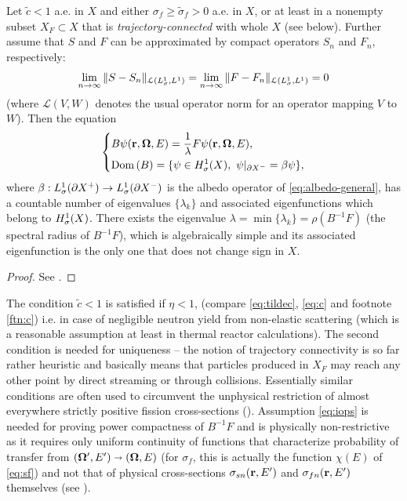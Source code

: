 \begin{theorem}\label{thm:eigenvalue}
	Let $\tilde{c} < 1$ a.e. in $X$ and either $\sigma_f \geq \tilde{\sigma}_f > 0$ a.e. in $X$, or at least in a nonempty
	subset $X_F \subset X$ that is \textit{trajectory-connected} with whole $X$ (see below). 
	Further assume that $S$ and $F$ can be approximated by compact operators $S_n$ and $F_n$, respectively:
\begin{equation}\label{eq:iops}
	\lim_{n\to\infty}\Vert S-S_n\Vert_{\mathcal{L}(\Lp[1]_{\sigma},\Lp[1])} = 
	\lim_{n\to\infty}\Vert F-F_n\Vert_{\mathcal{L}(\Lp[1]_{\sigma},\Lp[1])} = 0
\end{equation}
(where $\mathcal{L}(V,W)$ denotes the usual operator norm for an operator mapping $V$ to $W$).
Then the equation
\begin{equation*}
\left\{
  \begin{aligned}
     &B\psi(\br,\bomega,E) = \frac{1}{\lambda} F\psi(\br,\bomega,E),\\
     &\Dom{B} = \{\psi\in \Hp[1]_{\sigma}(X),\ \psi\vert_{\pX[-]} = \beta\psi\},
  \end{aligned}
\right.
\end{equation*}
where $\beta : \Lp[1]_{\sigma}(\pX[+]) \to \Lp[1]_{\sigma}(\pX[-])$ is the albedo operator of
\eqref{eq:albedo-general}, has a countable number of eigenvalues $\{\lambda_k\}$ and associated eigenfunctions which
belong to $\Hp[1]_{\sigma}(X)$.
There exists the eigenvalue $\lambda = \min \{\lambda_k\} = \rho(B^{-1}F)$ (the spectral radius of $B^{-1}F$), which is
algebraically simple and its associated eigenfunction is the only one that does not change sign in $X$.
\end{theorem}
\begin{proof}
See \cite{Sanchez3}.
\end{proof}
The condition $\tilde{c} < 1$ is satisfied if $\eta < 1$, (compare \eqref{eq:tildec}, \eqref{eq:c} and footnote
\ref{ftn:c}) i.e. in case of negligible neutron yield from non-elastic scattering (which is a reasonable assumption at
least in thermal reactor calculations). The second condition is needed for uniqueness -- the notion of trajectory
connectivity is so far rather heuristic and basically means that particles produced in $X_F$ may reach any other point 
by direct streaming or through collisions. Essentially similar conditions are often used to circumvent the
unphysical restriction of almost everywhere strictly positive fission cross-sections 
(\cite{MokhtarKharroubi,AllaireHomogenization}). Assumption \eqref{eq:iops} is needed for proving power compactness of
$B^{-1}F$ and is physically non-restrictive as it requires only uniform continuity of functions that
characterize probability of transfer from $(\bomega', E') \sra (\bomega,E)$ (for $\sigma_f$, this is actually the
function $\chi(E)$ of \eqref{eq:sf}) and not that of physical cross-sections $\sigma_{sn}(\br,E')$ and
$\sigma_{fn}(\br,E')$ themselves (see \cite{Sanchez3}).

